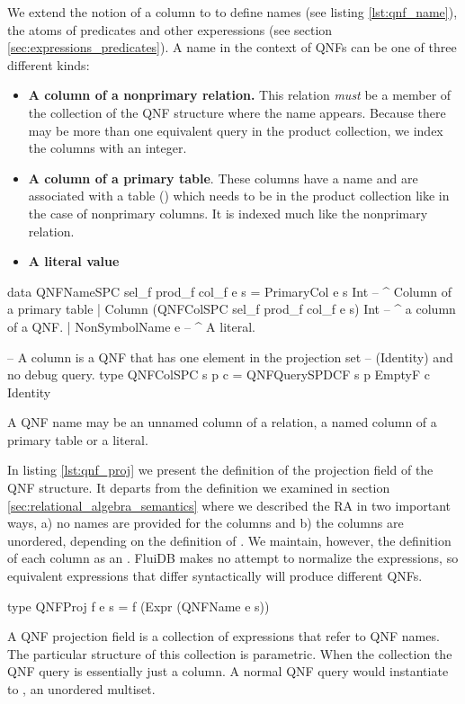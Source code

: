 We extend the notion of a column to to define names (see listing
\ref{lst:qnf_name}), the atoms of predicates and other experessions
(see section \ref{sec:expressions_predicates}).  A name in the context
of QNFs can be one of three different kinds:

\begin{itemize}
\item \textbf{A column of a nonprimary relation.} This relation
  \emph{must} be a member of the  collection of the
  QNF structure where the name appears.  Because there may be more
  than one equivalent query in the product collection, we index the
  columns with an integer.
\item \textbf{A column of a primary table}. These columns have a name
  and are associated with a table () which needs to be in the
  product collection like in the case of nonprimary columns. It is
  indexed much like the nonprimary relation.
\item \textbf{A literal value}
\end{itemize}

\begin{code}
  \begin{haskellcode}
    data QNFNameSPC sel_f prod_f col_f e s =
      PrimaryCol e s Int
      -- ^ Column of a primary table
      | Column (QNFColSPC sel_f prod_f col_f e s) Int
      -- ^ a column of a QNF.
      | NonSymbolName e
      -- ^ A literal.

    -- A column is a QNF that has one element in the projection set
    -- (Identity) and no debug query.
    type QNFColSPC s p c = QNFQuerySPDCF s p EmptyF c Identity
  \end{haskellcode}
  \caption{\label{lst:qnf_name}A QNF name may be an unnamed column of
    a relation, a named column of a primary table or a literal.}
\end{code}

In listing \ref{lst:qnf_proj} we present the definition of the projection
field of the QNF structure. It departs from the definition we examined in
section \ref{sec:relational_algebra_semantics} where we described the RA in two
important ways, a) no names are provided for the columns and b) the columns are
unordered, depending on the definition of .
We maintain, however, the definition of each column as an .
FluiDB makes no attempt to normalize the expressions, so equivalent
expressions that differ syntactically will produce different QNFs.

\begin{code}
  \begin{haskellcode}
    type QNFProj f e s = f (Expr (QNFName e s))
  \end{haskellcode}
  \caption{\label{lst:qnf_proj}A QNF projection field is a collection of
    expressions that refer to QNF names. The particular structure of
    this collection is parametric. When the collection 
    the QNF query is essentially just a column. A normal QNF query
    would instantiate  to , an unordered
    multiset.}
\end{code}

